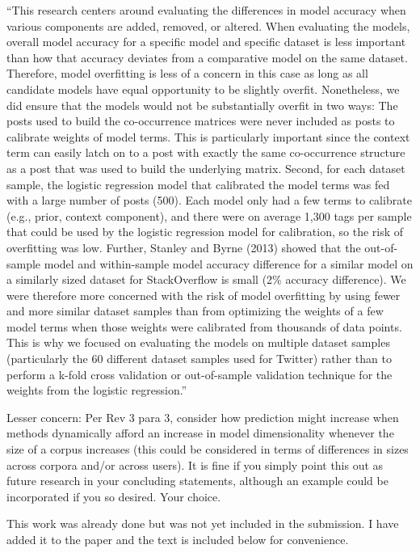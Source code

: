\documentclass[answers,12pt]{exam}
\begin{document}
\begin{questions}
\begin{solution}
``This research centers around evaluating the differences in model accuracy when various components are added, removed, or altered. When evaluating the models, overall model accuracy for a specific model and specific dataset is less important than how that accuracy deviates from a comparative model on the same dataset. Therefore, model overfitting is less of a concern in this case as long as all candidate models have equal opportunity to be slightly overfit. Nonetheless, we did ensure that the models would not be substantially overfit in two ways: The posts used to build the co-occurrence matrices were never included as posts to calibrate weights of model terms. This is particularly important since the context term can easily latch on to a post with exactly the same co-occurrence structure as a post that was used to build the underlying matrix. Second, for each dataset sample, the logistic regression model that calibrated the model terms was fed with a large number of posts (500). Each model only had a few terms to calibrate (e.g., prior, context component), and there were on average 1,300 tags per sample that could be used by the logistic regression model for calibration, so the risk of overfitting was low. Further, Stanley and Byrne (2013) showed that the out-of-sample model and within-sample model accuracy difference for a similar model on a similarly sized dataset for StackOverflow is small (2\% accuracy difference). We were therefore more concerned with the risk of model overfitting by using fewer and more similar dataset samples than from optimizing the weights of a few model terms when those weights were calibrated from thousands of data points. This is why we focused on evaluating the models on multiple dataset samples (particularly the 60 different dataset samples used for Twitter) rather than to perform a k-fold cross validation or out-of-sample validation technique for the weights from the logistic regression.''

\end{solution}

\question Lesser concern: Per Rev 3 para 3, consider how prediction might increase when methods dynamically afford an increase in model dimensionality whenever the size of a corpus increases (this could be considered in terms of differences in sizes across corpora and/or across users). It is fine if you simply point this out as future research in your concluding statements, although an example could be incorporated if you so desired. Your choice.

\begin{solution}
This work was already done but was not yet included in the submission.
I have added it to the paper and the text is included below for convenience.


\end{solution}
\end{questions}
\end{document}
